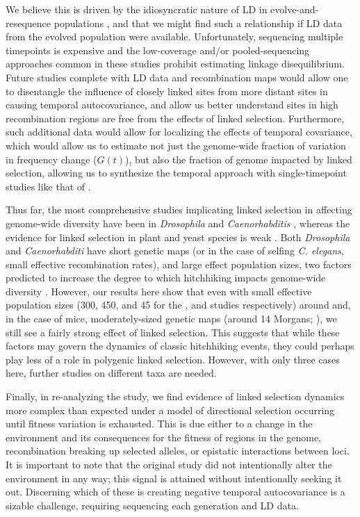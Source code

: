 \documentclass[11pt]{article}
\begin{document}
We believe this is driven by the idiosyncratic nature of LD in
evolve-and-resequence populations \parencite{Nuzhdin2013-gf,Kelly2019-dc}, and
that we might find such a relationship if LD data from the evolved population
were available. Unfortunately, sequencing multiple timepoints is expensive and
the low-coverage and/or pooled-sequencing approaches common in these studies
prohibit estimating linkage disequilibrium. Future studies complete with LD
data and recombination maps would allow one to disentangle the influence of
closely linked sites from more distant sites in causing temporal
autocovariance, and allow us better understand sites in high recombination
regions are free from the effects of linked selection. Furthermore, such
additional data would allow for localizing the effects of temporal covariance,
which would allow us to estimate not just the genome-wide fraction of variation
in frequency change ($G(t)$), but also the fraction of genome impacted by
linked selection, allowing us to synthesize the temporal approach with
single-timepoint studies like that of \textcite{Elyashiv2016-vt}.


Thus far, the most comprehensive studies implicating linked selection in
affecting genome-wide diversity have been in \emph{Drosophila}
\parencite{Begun1992-ey,Elyashiv2016-vt,Sattath2011-dr} and
\emph{Caenorhabditis} \cite{Cutter2003-tl,Cutter2003-tl,Andersen2012-bj},
whereas the evidence for linked selection in plant and yeast species is weak
\parencite{Cutter2013-ba}. Both \emph{Drosophila} and \emph{Caenorhabditi} have
short genetic maps (or in the case of selfing \emph{C.  elegans}, small
effective recombination rates), and large effect population sizes, two factors
predicted to increase the degree to which hitchhiking impacts genome-wide
diversity \parencite{Barton2000-zg}. However, our results here show that even
with small effective population sizes (300, 450, and 45 for the
\textcite{Kelly2019-dc}, and \textcite{Castro2019-uk} studies respectively)
around and, in the case of mice, moderately-sized genetic maps (around 14
Morgans; \cite{Cox2009-hf}), we still see a fairly strong effect of linked
selection. This suggests that while these factors may govern the dynamics of
classic hitchhiking events, they could perhaps play less of a role in polygenic
linked selection. However, with only three cases here, further studies on
different taxa are needed.

Finally, in re-analyzing the \textcite{Barghi2019-qy} study, we find evidence
of linked selection dynamics more complex than expected under a model of
directional selection occurring until fitness variation is exhausted. This is
due either to a change in the environment and its consequences for the fitness
of regions in the genome, recombination breaking up selected alleles, or
epistatic interactions between loci. It is important to note that the original
study did not intentionally alter the environment in any way; this signal is
attained without intentionally seeking it out. Discerning which of these is
creating negative temporal autocovariance is a sizable challenge, requiring
sequencing each generation and LD data.
\end{document}
